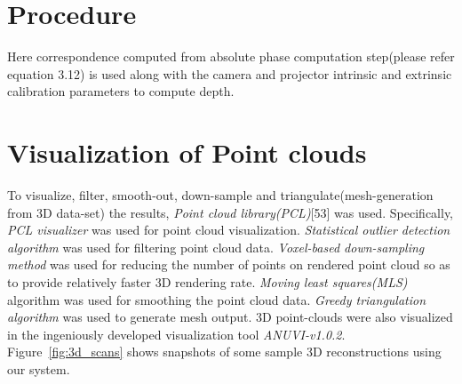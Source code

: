 \section{Procedure}
Here correspondence computed from absolute phase computation step(please refer equation 3.12) is used along with the camera and projector intrinsic and extrinsic calibration parameters to compute depth. 

\section{Visualization of Point clouds}
To visualize, filter, smooth-out, down-sample and triangulate(mesh-generation from 3D data-set) the results, \textit{Point cloud library(PCL)}[53] was used. Specifically, \textit{PCL visualizer} was used for point cloud visualization. \textit{Statistical outlier detection algorithm} was used for filtering  point cloud data. \textit{Voxel-based down-sampling method} was used for reducing the number of points on rendered point cloud so as to provide relatively faster 3D rendering rate. \textit{Moving least squares(MLS)} algorithm was used for smoothing the point cloud data. \textit{Greedy triangulation algorithm} was used to generate mesh output. 3D point-clouds were also visualized in the ingeniously developed visualization tool \textit{ANUVI-v1.0.2}.
Figure~\ref{fig:3d_scans} shows snapshots of some sample 3D reconstructions using our system.


